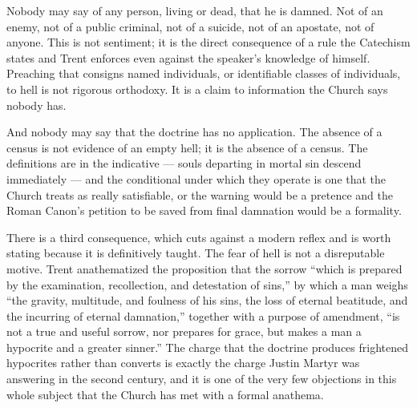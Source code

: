 Nobody may say of any person, living or dead, that he is damned. Not of an enemy, not of a public criminal, not of a suicide, not of an apostate, not of anyone. This is not sentiment; it is the direct consequence of a rule the Catechism states and Trent enforces even against the speaker's knowledge of himself. Preaching that consigns named individuals, or identifiable classes of individuals, to hell is not rigorous orthodoxy. It is a claim to information the Church says nobody has.

And nobody may say that the doctrine has no application. The absence of a census is not evidence of an empty hell; it is the absence of a census. The definitions are in the indicative --- souls departing in mortal sin descend immediately --- and the conditional under which they operate is one that the Church treats as really satisfiable, or the warning would be a pretence and the Roman Canon's petition to be saved from final damnation would be a formality.

There is a third consequence, which cuts against a modern reflex and is worth stating because it is definitively taught. The fear of hell is not a disreputable motive. Trent anathematized the proposition that the sorrow ``which is prepared by the examination, recollection, and detestation of sins,'' by which a man weighs ``the gravity, multitude, and foulness of his sins, the loss of eternal beatitude, and the incurring of eternal damnation,'' together with a purpose of amendment, ``is not a true and useful sorrow, nor prepares for grace, but makes a man a hypocrite and a greater sinner.'' The charge that the doctrine produces frightened hypocrites rather than converts is exactly the charge Justin Martyr was answering in the second century, and it is one of the very few objections in this whole subject that the Church has met with a formal anathema.
